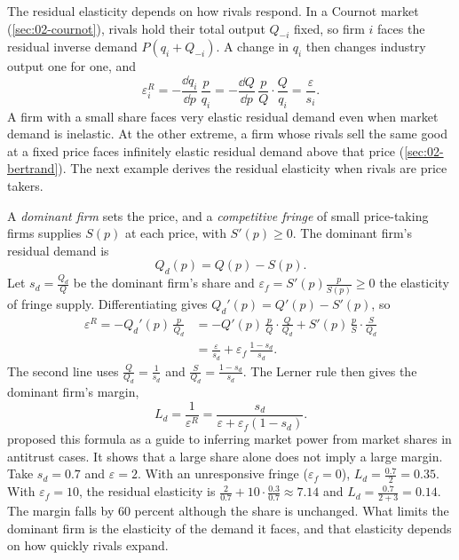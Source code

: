 The residual elasticity depends on how rivals respond. In a Cournot market (\cref{sec:02-cournot}), rivals hold
their total output $Q_{-i}$ fixed, so firm $i$ faces the residual inverse demand $P(q_i + Q_{-i})$. A change in
$q_i$ then changes industry output one for one, and
\begin{equation}\label{eq:02-cournot-residual}
  \varepsilon_i^R = -\frac{\dd q_i}{\dd p}\,\frac{p}{q_i}
    = -\frac{\dd Q}{\dd p}\,\frac{p}{Q}\cdot\frac{Q}{q_i} = \frac{\varepsilon}{s_i} .
\end{equation}
A firm with a small share faces very elastic residual demand even when market demand is inelastic. At the other
extreme, a firm whose rivals sell the same good at a fixed price faces infinitely elastic residual demand above that
price (\cref{sec:02-bertrand}). The next example derives the residual elasticity when rivals are price takers.

\begin{example}\label{ex:02-dominant}
A \emph{dominant firm} sets the price, and a \emph{competitive fringe} of small price-taking firms supplies $S(p)$
at each price, with $S'(p) \ge 0$. The dominant firm's residual demand is
\[
  Q_d(p) = Q(p) - S(p) .
\]
Let $s_d = \frac{Q_d}{Q}$ be the dominant firm's share and $\varepsilon_f = S'(p)\frac{p}{S(p)} \ge 0$ the
elasticity of fringe supply. Differentiating gives $Q_d'(p) = Q'(p) - S'(p)$, so
\begin{align*}
  \varepsilon^R = -Q_d'(p)\,\frac{p}{Q_d}
    &= -Q'(p)\,\frac{p}{Q}\cdot\frac{Q}{Q_d} + S'(p)\,\frac{p}{S}\cdot\frac{S}{Q_d} \\
    &= \frac{\varepsilon}{s_d} + \varepsilon_f\,\frac{1 - s_d}{s_d} .
\end{align*}
The second line uses $\frac{Q}{Q_d} = \frac{1}{s_d}$ and $\frac{S}{Q_d} = \frac{1 - s_d}{s_d}$. The Lerner rule then
gives the dominant firm's margin,
\begin{equation}\label{eq:02-dominant-lerner}
  L_d = \frac{1}{\varepsilon^R} = \frac{s_d}{\varepsilon + \varepsilon_f(1 - s_d)} .
\end{equation}
\citet{LandesPosner1981} proposed this formula as a guide to inferring market power from market shares in antitrust
cases. It shows that a large share alone does not imply a large margin. Take $s_d = 0.7$ and $\varepsilon = 2$. With
an unresponsive fringe ($\varepsilon_f = 0$), $L_d = \frac{0.7}{2} = 0.35$. With $\varepsilon_f = 10$, the residual
elasticity is $\frac{2}{0.7} + 10\cdot\frac{0.3}{0.7} \approx 7.14$ and $L_d = \frac{0.7}{2 + 3} = 0.14$. The
margin falls by 60 percent although the share is unchanged. What limits the dominant firm is the elasticity of the
demand it faces, and that elasticity depends on how quickly rivals expand.
\end{example}


